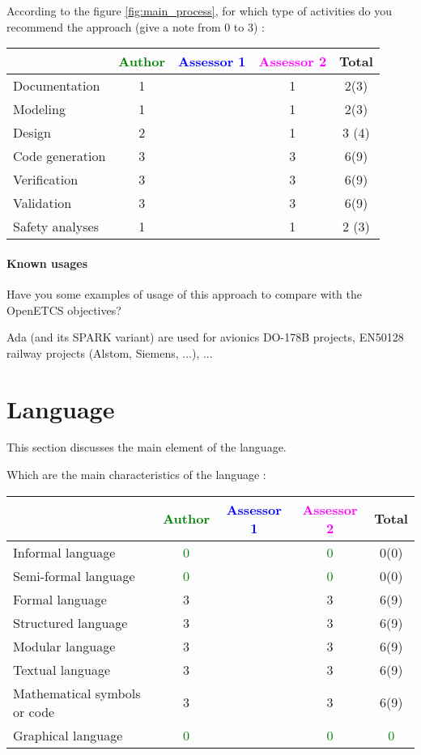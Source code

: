 According to the figure \ref{fig:main_process}, for which type of activities do you recommend the approach (give a note from 0 to  3) :

\begin{tabular}{|l | c | c | c | c|}
\hline
& \textcolor{green}{Author} & \textcolor{blue}{Assessor 1} & \textcolor{magenta}{Assessor 2} & Total \\
\hline 
Documentation & 1     & & 1     &  2(3) \\
\hline
Modeling & 1     & & 1     &  2(3) \\
\hline
Design & 2     & & 1     & 3 (4) \\
\hline
Code generation & 3     & & 3     &  6(9) \\
\hline
Verification & 3     & & 3     &  6(9) \\
\hline
Validation & 3     & & 3     &  6(9) \\
\hline
Safety analyses & 1     & & 1     & 2 (3) \\
\hline
\end{tabular}

\paragraph{Known usages} Have you some examples of usage of this approach to  compare with the OpenETCS objectives?

Ada (and its SPARK variant) are used for avionics DO-178B
projects, EN50128 railway projects (Alstom, Siemens, ...), ...

\section{Language}
This section discusses the main element of the language.

Which are the main characteristics of the language :

\begin{tabular}{|l | c | c | c | c|}
\hline
& \textcolor{green}{Author} & \textcolor{blue}{Assessor 1} & \textcolor{magenta}{Assessor 2} & Total \\
\hline 
Informal language & \textcolor{green}{0} & & \textcolor{green}{0} &  0(0) \\
\hline 
Semi-formal language & \textcolor{green}{0} & & \textcolor{green}{0} &  0(0) \\
\hline
Formal language & 3     & & 3     &  6(9) \\
\hline
Structured language & 3     & & 3     &  6(9) \\
\hline
Modular language & 3     & & 3     &  6(9) \\
\hline
Textual language & 3     & & 3     &  6(9) \\
\hline
Mathematical symbols or code & 3     & & 3     &  6(9) \\
\hline
Graphical language & \textcolor{green}{0} & & \textcolor{green}{0} & \textcolor{green}{0}  \\
\hline
\end{tabular}

